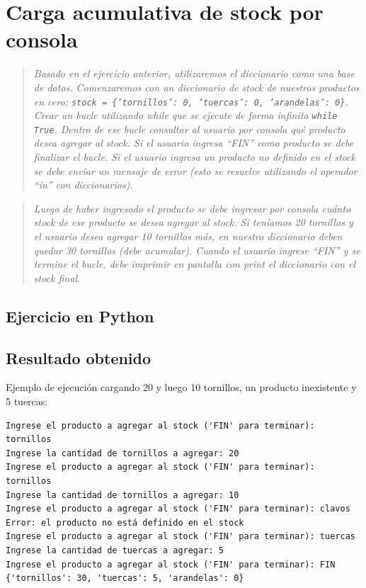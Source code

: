 \documentclass[12pt]{article}
\newcommand{\codigopython}[2]{%
}
\newcommand{\enunciado}[1]{%
    \begin{quote}
        \itshape #1
    \end{quote}
}
\begin{document}

\section{Carga acumulativa de stock por consola}

\enunciado{Basado en el ejercicio anterior, utilizaremos el diccionario como una base de datos. Comenzaremos con un diccionario de stock de nuestros productos en cero: \texttt{stock = \{'tornillos': 0, 'tuercas': 0, 'arandelas': 0\}}. Crear un bucle utilizando while que se ejecute de forma infinita \texttt{while True}. Dentro de ese bucle consultar al usuario por consola qué producto desea agregar al stock. Si el usuario ingresa \enquote{FIN} como producto se debe finalizar el bucle. Si el usuario ingresa un producto no definido en el stock se debe enviar un mensaje de error (esto se resuelve utilizando el operador \enquote{in} con diccionarios).}

\enunciado{Luego de haber ingresado el producto se debe ingresar por consola cuánto stock de ese producto se desea agregar al stock. Si teníamos 20 tornillos y el usuario desea agregar 10 tornillos más, en nuestro diccionario deben quedar 30 tornillos (debe acumular). Cuando el usuario ingrese \enquote{FIN} y se termine el bucle, debe imprimir en pantalla con print el diccionario con el stock final.}

\subsection*{Ejercicio en Python}

\codigopython{02}{Carga acumulativa de stock por consola}

\subsection*{Resultado obtenido}

Ejemplo de ejecución cargando 20 y luego 10 tornillos, un producto inexistente y 5 tuercas:

\begin{lstlisting}[style=salida]
Ingrese el producto a agregar al stock ('FIN' para terminar): tornillos
Ingrese la cantidad de tornillos a agregar: 20
Ingrese el producto a agregar al stock ('FIN' para terminar): tornillos
Ingrese la cantidad de tornillos a agregar: 10
Ingrese el producto a agregar al stock ('FIN' para terminar): clavos
Error: el producto no está definido en el stock
Ingrese el producto a agregar al stock ('FIN' para terminar): tuercas
Ingrese la cantidad de tuercas a agregar: 5
Ingrese el producto a agregar al stock ('FIN' para terminar): FIN
{'tornillos': 30, 'tuercas': 5, 'arandelas': 0}
\end{lstlisting}
\end{document}
